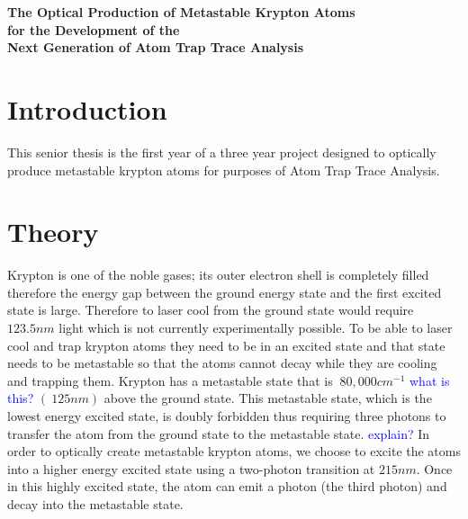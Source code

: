\documentclass[prb,preprint]{revtex4-1}
\begin{document}
\begin{titlepage}
\thispagestyle{empty}
\begin{center}

\fontsize{20pt}{20pt}\text{   }
\vspace{30mm}

{\fontsize{18pt}{18pt}\selectfont \textbf{The Optical Production of Metastable Krypton Atoms \\ for the Development of the \\ Next Generation of Atom Trap Trace Analysis}}


\vfill
{\fontsize{14pt}{14pt}\selectfont {}}

\vfill




\vfill
{\fontsize{14pt}{14pt} \selectfont {}}


\vfill
{}
\vfill

\end{center}
\end{titlepage}


\section{Introduction} 
This senior thesis is the first year of a three year project designed to optically produce metastable krypton atoms for purposes of Atom Trap Trace Analysis.

\section{Theory}

Krypton is one of the noble gases; its outer electron shell is completely filled therefore the energy gap between the ground energy state and the first excited state is large. Therefore to laser cool from the ground state would require $123.5 nm$ light which is not currently experimentally possible. To be able to laser cool and trap krypton atoms they need to be in an excited state and that state needs to be metastable so that the atoms cannot decay while they are cooling and trapping them. Krypton has a metastable state that is $~80,000 cm^{-1}$ \textcolor{blue}{what is this?} $(~125 nm)$ above the ground state.  This metastable state, which is the lowest energy excited state, is doubly forbidden thus requiring three photons to transfer the atom from the ground state to the metastable state. \textcolor{blue}{explain?} In order to optically create metastable krypton atoms, we choose to excite the atoms into a higher energy excited state using a two-photon transition at $215 nm$.  Once in this highly excited state, the atom can emit a photon (the third photon) and decay into the metastable state. 
\end{document}
